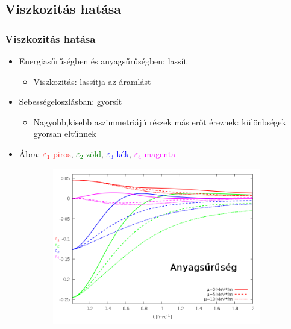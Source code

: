 \documentclass{beamer}
\begin{document}
\subsection{Viszkozitás hatása}
\begin{frame}
\frametitle{Viszkozitás hatása}
\begin{center}
\begin{itemize}
  \setlength{\itemsep}{2pt}

\item<1-> Energiasűrűségben és  anyagsűrűségben: lassít
\begin{itemize}
\item<1-> Viszkozitás: lassítja az áramlást
\end{itemize}
\item<2-> Sebességeloszlásban: gyorsít
\begin{itemize}
\item<2-> Nagyobb,kisebb aszimmetriájú részek más erőt éreznek: különbségek gyorsan eltűnnek
\end{itemize}
\item Ábra: \large{\textcolor{red}{$\varepsilon_1$ piros}, \textcolor{green}{$\varepsilon_2$ zöld}, \textcolor{blue}{$\varepsilon_3$ kék},  \textcolor{magenta}{$\varepsilon_4$ magenta}}
\end{itemize}
\begin{figure}[H]
	\centering
    \begin{subfigure}[b]{0.49\textwidth}
    		\includegraphics[width=\textwidth]{pic/res/nonrel/eps_visc_r}
	\end{subfigure}
	\begin{subfigure}[b]{0.49\textwidth}

\end{subfigure}
\end{figure}
\end{center}
\end{frame}
\end{document}
